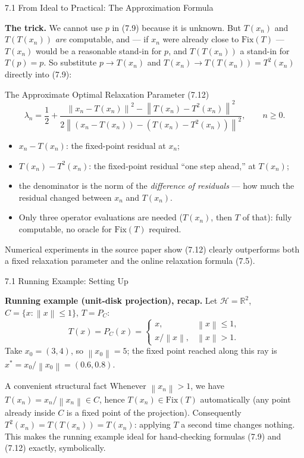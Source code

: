 \documentclass[aspectratio=169,10pt]{beamer}
\newcommand{\mHH}{\mathcal H}
\newcommand{\norm}[1]{\left\|#1\right\|}
\newcommand{\Fix}{\mathrm{Fix}}
\newcommand{\R}{\mathbb{R}}
\begin{document}
\begin{frame}{7.1 From Ideal to Practical: The Approximation Formula}

  \textbf{The trick.} We cannot use $p$ in (7.9) because it is
  unknown. But $T(x_n)$ and $T(T(x_n))$ \emph{are} computable, and
  --- if $x_n$ were already close to $\Fix(T)$ --- $T(x_n)$ would be
  a reasonable stand-in for $p$, and $T(T(x_n))$ a stand-in for
  $T(p)=p$. So substitute $p\to T(x_n)$ and $T(x_n)\to T(T(x_n))=T^2(x_n)$
  directly into (7.9):

  \begin{block}{The Approximate Optimal Relaxation Parameter (7.12)}
    \[
      \lambda_n = \frac{1}{2} +
        \frac{\norm{x_n-T(x_n)}^2 - \norm{T(x_n)-T^2(x_n)}^2}
             {2\norm{(x_n-T(x_n))-(T(x_n)-T^2(x_n))}^2}, \qquad n\ge0.
    \]
    \begin{itemize}
      \item $x_n-T(x_n)$: the fixed-point residual at $x_n$;
      \item $T(x_n)-T^2(x_n)$: the fixed-point residual ``one step
            ahead,'' at $T(x_n)$;
      \item the denominator is the norm of the \emph{difference of
            residuals} --- how much the residual changed between
            $x_n$ and $T(x_n)$.
      \item Only three operator evaluations are needed
            ($T(x_n)$, then $T$ of that): fully computable, no
            oracle for $\Fix(T)$ required.
    \end{itemize}
  \end{block}

  Numerical experiments in the source paper show (7.12) clearly
  outperforms both a fixed relaxation parameter and the online
  relaxation formula (7.5).

\end{frame}

\begin{frame}{7.1 Running Example: Setting Up}

  \textbf{Running example (unit-disk projection), recap.} Let
  $\mHH=\R^2$, $C=\{x:\norm{x}\le1\}$, $T=P_C$:
  \[
    T(x)=P_C(x)=
    \begin{cases}
      x, & \norm{x}\le1,\\
      x/\norm{x}, & \norm{x}>1.
    \end{cases}
  \]
  Take $x_0=(3,4)$, so $\norm{x_0}=5$; the fixed point reached along
  this ray is $x^*=x_0/\norm{x_0}=(0.6,0.8)$.

  \begin{alertblock}{A convenient structural fact}
    Whenever $\norm{x_n}>1$, we have $T(x_n)=x_n/\norm{x_n}\in C$,
    hence $T(x_n)\in\Fix(T)$ automatically (any point already inside
    $C$ is a fixed point of the projection). Consequently
    $T^2(x_n)=T(T(x_n))=T(x_n)$: applying $T$ a second time changes
    nothing. This makes the running example ideal for hand-checking
    formulas (7.9) and (7.12) exactly, symbolically.
  \end{alertblock}

\end{frame}
\end{document}
